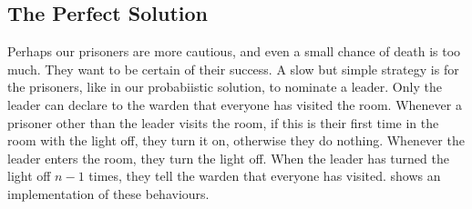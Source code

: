 \subsection{The Perfect Solution}

Perhaps our prisoners are more cautious, and even a small chance of
death is too much.  They want to be certain of their success.  A slow
but simple strategy is for the prisoners, like in our probabiistic
solution, to nominate a leader.  Only the leader can declare to the
warden that everyone has visited the room.  Whenever a prisoner other
than the leader visits the room, if this is their first time in the
room with the light off, they turn it on, otherwise they do nothing.
Whenever the leader enters the room, they turn the light off.  When
the leader has turned the light off $n-1$ times, they tell the warden
that everyone has visited.   shows an
implementation of these behaviours.


